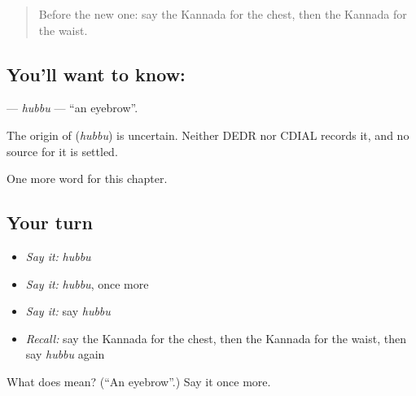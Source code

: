 \label{lesson:KA-C136-hubbu}



\begin{quote}
Before the new one: say the Kannada for the chest, then the Kannada for the waist.
\end{quote}

\subsection*{You'll want to know: }
\textbf{} — \emph{hubbu} — \textquotedblleft{}an eyebrow\textquotedblright{}.

\begin{cousinweb}
The origin of \textbf{} (\emph{hubbu}) is uncertain. Neither DEDR nor CDIAL records it, and no source for it is settled.
\end{cousinweb}

\begin{grammarlens}[title={What you've built}]
One more word for this chapter.
\end{grammarlens}

\subsection*{Your turn}
\begin{itemize}
\raggedright
  \item \emph{Say it:} \emph{hubbu}
  \item \emph{Say it:} \emph{hubbu}, once more
  \item \emph{Say it:} say \emph{hubbu}
  \item \emph{Recall:} say the Kannada for the chest, then the Kannada for the waist, then say \emph{hubbu} again
\end{itemize}

\begin{tcolorbox}[breakable,colback=teal!4,colframe=teal!35!black,title={Before you move on}]
What does  mean? (\textquotedblleft{}An eyebrow\textquotedblright{}.) Say it once more.
\end{tcolorbox}
